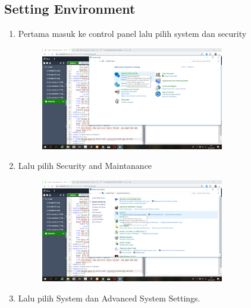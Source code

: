 \documentclass{article}
\begin{document}
\subsection{Setting Environment}
\begin{enumerate}
    \item Pertama masuk ke control panel lalu pilih system dan security
        \begin{figure}[h]
            \centerline{\includegraphics[width=8cm]{image/cpanel.png}}
        \end{figure}
    \item Lalu pilih Security and Maintanance
        \begin{figure}[h]
            \centerline{\includegraphics[width=8cm]{image/securityandmain.png}}
        \end{figure}
   \newpage
   \item Lalu pilih System dan Advanced System Settings.

\end{enumerate}
\end{document}
